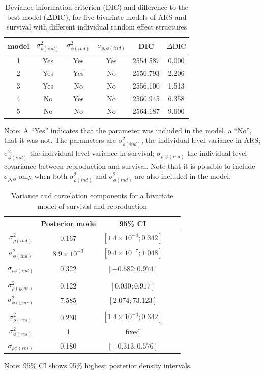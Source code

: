 \begin{table}[ht]
\caption{Deviance information criterion (DIC) and difference to the best model ($\Delta$DIC), for five bivariate models of ARS and survival with different individual random effect structures}
\label{DICtable}
\begin{center}
\footnotesize
\begin{tabular}{cccccc}
	\toprule
	model & $\sigma_{\rho (ind)}^2$ & $\sigma_{\phi (ind)}^2$ & $\sigma_{\rho,\phi (ind)}$& DIC & $\Delta \mathrm{DIC}$ \\
	\midrule
	1 & Yes & Yes & Yes & 2554.587 & 0.000\\
	2 & Yes & Yes & No & 2556.793 & 2.206\\
	3 & Yes & No & No & 2556.100 & 1.513\\
	4 & No & Yes & No & 2560.945 & 6.358\\
	5 & No & No & No & 2564.187 & 9.600\\
	\bottomrule
	\end{tabular}
	\end{center}
{\scriptsize	Note: A ``Yes'' indicates that the parameter was included in the model, a ``No'', that it was not. The parameters are $\sigma_{\rho (ind)}^2$, the individual-level variance in ARS; $\sigma_{\phi (ind)}^2$ the individual-level variance in survival; $\sigma_{\rho,\phi (ind)}$ the individual-level covariance between reproduction and survival. Note that it is possible to include $\sigma_{\rho,\phi}$ only when both $\sigma_{\rho (ind)}^2$ and $\sigma_{\phi (ind)}^2$ are also included in the model.}
\end{table}
	
\begin{table}[ht]

\caption{Variance and correlation components for a bivariate model of survival and reproduction} 
\label{MCMCtable}
\begin{center}
\footnotesize
\begin{tabular}{ccccc}
  \toprule
 & Posterior mode & 95\% CI \\ 
  \midrule
$\sigma_{\rho (ind)}^2$ & 0.167 &$[1.4\times 10^{-4};0.342]$ \\ 
  $\sigma_{\phi (ind)}^2$ &$8.9\times 10^{-3}$&$[9.4 \times 10^{-7};1.048]$ \\ 
  $\sigma_{\rho \phi (ind)}$ & 0.322 &$[-0.682;0.974]$ \\ 
   \\
$\sigma_{\rho (year)}^2$ & 0.122&$[0.030;0.917]$ \\ 
  $\sigma_{\phi (year)}^2$ & 7.585 &$[2.074;73.123]$ \\ 
   \\
	$\sigma_{\rho (res)}^2$ & 0.230 &$[1.4\times 10^{-4};0.342]$ \\ 
  $\sigma_{\phi (res)}^2$ & 1 & fixed \\ 
  $\sigma_{\rho \phi (res)}$ & 0.180 &$[-0.313;0.576]$ \\ 
	\bottomrule
\end{tabular}
\end{center}
{\scriptsize Note: 95\% CI shows 95\% highest posterior density intervals.}
\end{table}

